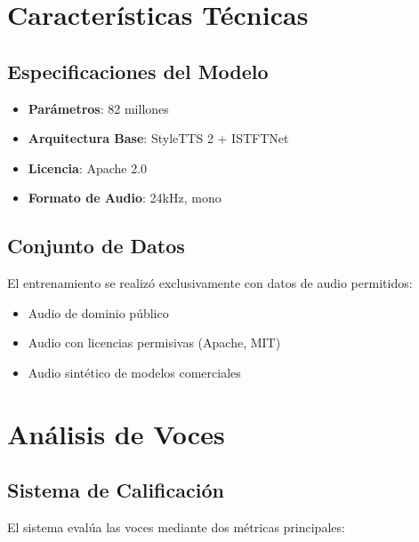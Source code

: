 \section{Características Técnicas}
\label{sec:technical-features}

\subsection{Especificaciones del Modelo}
\begin{itemize}
	\item \textbf{Parámetros}: 82 millones
	\item \textbf{Arquitectura Base}: StyleTTS 2 + ISTFTNet
	\item \textbf{Licencia}: Apache 2.0
	\item \textbf{Formato de Audio}: 24kHz, mono
\end{itemize}

\subsection{Conjunto de Datos}
El entrenamiento se realizó exclusivamente con datos de audio permitidos:
\begin{itemize}
	\item Audio de dominio público
	\item Audio con licencias permisivas (Apache, MIT)
	\item Audio sintético de modelos comerciales
\end{itemize}

\section{Análisis de Voces}
\label{sec:voice-analysis}

\subsection{Sistema de Calificación}
\label{subsec:grading-system}

El sistema evalúa las voces mediante dos métricas principales:


